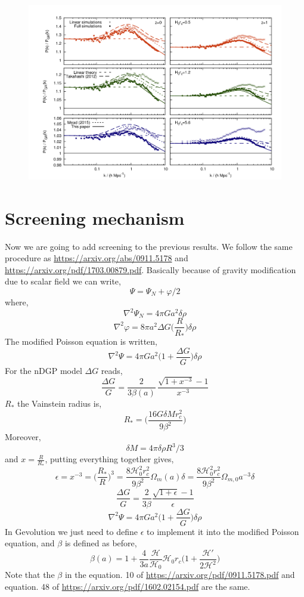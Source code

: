 \documentclass[a4paper,10pt]{article}
\def\be{\begin{equation}}
\def\ee{\end{equation}}
\newcommand{\HH}{\mathcal H}
\begin{document}
         \begin{figure}[H]
 \includegraphics[scale=0.5]{./Images/ndgp_004}  
 \end{figure} 
\section{Screening mechanism}
Now we are going to add screening to the previous results. We follow the same procedure as \url{https://arxiv.org/abs/0911.5178} and \url{https://arxiv.org/pdf/1703.00879.pdf}. Basically because of gravity modification due to scalar field we can write,
\be
\Psi = \Psi_N + \varphi/2
\ee
where,
\be
\nabla^2 \Psi_N = 4 \pi G a^2 \delta \rho
\ee
\be
\nabla^2 \varphi = 8 \pi a^2 \Delta G  \big( \frac{R}{R_*}\big) \delta \rho
\ee
The modified Poisson equation is written,
\be
\nabla^2 \Psi = 4 \pi G a^2 \big( 1+ \frac{\Delta G}{G} \big) \delta \rho
\ee
For the nDGP model $\Delta G$ reads,
\be
\frac{\Delta G}{G } = \frac{2}{3 \beta (a)}   \,\frac{ \sqrt{1+ x^{-3} }-1 }{x^{-3}}
\ee
$R_*$ the Vainstein radius is,
\be
R_* = \Big( \frac{16 G \delta M r_c^2}{9 \beta^2} \Big)
\ee
Moreover,
\be
\delta M= 4 \pi \delta \rho R^3/3
\ee
and  $x= \frac{R}{R_*} $, putting everything together gives,
\be
\epsilon = x^{-3} = \Big(\frac{R_*}{R}\Big)^3 = \frac{8 \HH_0^2 r_c^2}{9 \beta^2} \Omega_m(a) \delta =  \frac{8 \HH_0^2 r_c^2}{9 \beta^2} \Omega_{m,0} a^{-3} \delta
\ee
\be
\frac{\Delta G}{G} = \frac{2}{3 \beta} \frac{ \sqrt{1+\epsilon} -1} {\epsilon}
\ee
\be
\nabla^2 \Psi = 4 \pi G a^2 \big( 1+ \frac{\Delta G}{G} \big) \delta \rho
\ee
In Gevolution we just need to define $\epsilon$ to implement it into the modified Poisson equation,
and $\beta$ is defined as before,
\be
\beta(a) = 1+ \frac{4} {3 a }  \frac{\HH}{\HH_0} \HH_0 r_c    \Big ( 1+ \frac{\HH'}{2 \HH^2} \Big) 
\ee
Note that the $\beta$ in the equation. 10 of \url{https://arxiv.org/pdf/0911.5178.pdf} and equation. 48 of \url{https://arxiv.org/pdf/1602.02154.pdf} are the same.\\
\end{document}
